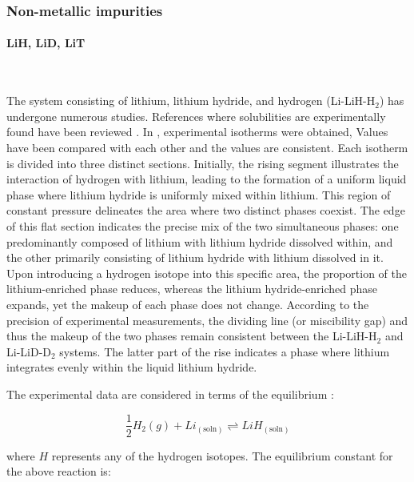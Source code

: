 \subsubsection{Non-metallic impurities}
\paragraph{LiH, LiD, LiT}~\\
\vspace{1mm} %

The system consisting of lithium, lithium hydride, and hydrogen (Li-LiH-H$_2$) has undergone numerous studies. References where solubilities are experimentally found have been reviewed \cite{Veleckis1974THELH,Smith1979,Wang2012,Katsuta1977,Veleckis1977}. 
In \cite{Smith1979}, experimental isotherms were obtained, 
Values have been compared with each other and the values are consistent. 
Each isotherm is divided into three distinct sections. Initially, the rising segment illustrates the interaction of hydrogen with lithium, leading to 
the formation of a uniform liquid phase where lithium hydride is uniformly mixed within lithium. This region of constant pressure delineates the area 
where two distinct phases coexist. The edge of this flat section indicates the precise mix of the two simultaneous phases: one predominantly composed of 
lithium with lithium hydride dissolved within, and the other primarily consisting of lithium hydride with lithium dissolved in it. Upon introducing a 
hydrogen isotope into this specific area, the proportion of the lithium-enriched phase reduces, whereas the lithium hydride-enriched phase expands, 
yet the makeup of each phase does not change. According to the precision of experimental measurements, the dividing line (or miscibility gap) and 
thus the makeup of the two phases remain consistent between the Li-LiH-H$_2$ and Li-LiD-D$_2$ systems. The latter part of the rise indicates a 
phase where lithium integrates evenly within the liquid lithium hydride.

The experimental data are considered in terms of the equilibrium \cite{Smith1979}:

\begin{equation}
\frac{1}{2} H_2(g) + Li_{(\text{soln})} \rightleftharpoons LiH_{(\text{soln})}
\end{equation}

where $H$ represents any of the hydrogen isotopes. The equilibrium constant for the above reaction is:

